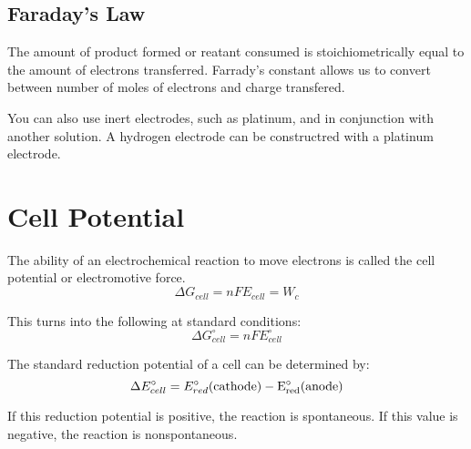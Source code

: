 \documentclass{article}
\begin{document}
\subsection{Faraday's Law}

The amount of product formed or reatant consumed is stoichiometrically equal to
the amount of electrons transferred. Farrady's constant allows us to convert
between number of moles of electrons and charge transfered. 

You can also use inert electrodes, such as platinum, and in conjunction with
another solution. A hydrogen electrode can be constructred with a platinum
electrode.

\section{Cell Potential}

The ability of an electrochemical reaction to move electrons is called the cell
potential or electromotive force.
$$\Delta G_{cell} = nFE_{cell} = W_c$$

This turns into the following at standard conditions:
$$\Delta G_{cell}^{\circ} = n F E_{cell}^{\circ}$$

The standard reduction potential of a cell can be determined by:
$$\Delta E^{\circ}_{cell} = E_{red}^{\circ}(\rm{cathode}) -
E_{red}^{\circ}(\rm{anode})$$

If this reduction potential is positive, the reaction is spontaneous. If this
value is negative, the reaction is nonspontaneous.
\end{document}
